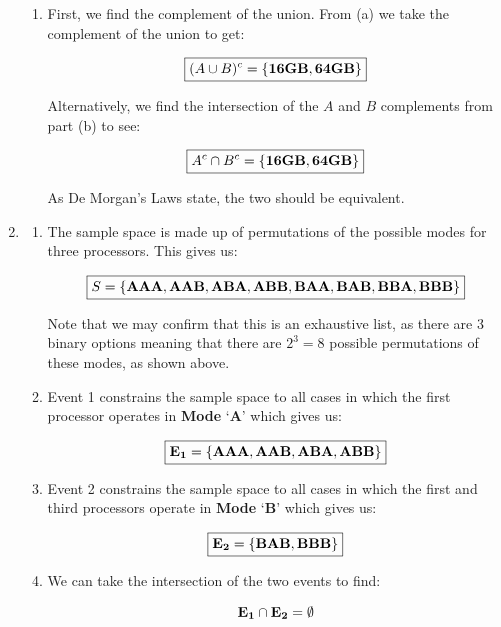 \begin{enumerate}
\begin{enumerate}
      \item First, we find the complement of the union. From (a) we take the complement of the union to get:

        $$\boxed{(A\cup B)^c=\left\{ \bold{16}\text{\textbf{GB}},\bold{64}\text{\textbf{GB}} \right\}}$$

        Alternatively, we find the intersection of the $A$ and $B$ complements from part (b) to see:

        $$\boxed{A^c\cap B^c=\left\{ \bold{16}\text{\textbf{GB}},\bold{64}\text{\textbf{GB}} \right\}}$$

        As De Morgan's Laws state, the two should be equivalent.

    \end{enumerate}

  \item 

    \begin{enumerate}

      \item The sample space is made up of permutations of the possible modes for three processors. This gives us:

        $$\boxed{S=\left\{ \text{\textbf{AAA}},\text{\textbf{AAB}},\text{\textbf{ABA}},\text{\textbf{ABB}},\text{\textbf{BAA}},\text{\textbf{BAB}},\text{\textbf{BBA}},\text{\textbf{BBB}} \right\}}$$

        Note that we may confirm that this is an exhaustive list, as there are 3 binary options meaning that there are $2^3=8$ possible permutations of these modes, as shown above.

      \item Event 1 constrains the sample space to all cases in which the first processor operates in \textbf{Mode} `\textbf{A}' which gives us:

        $$\boxed{\bold{E_1}=\left\{ \text{\textbf{AAA}},\text{\textbf{AAB}},\text{\textbf{ABA}},\text{\textbf{ABB}} \right\}}$$

      \item Event 2 constrains the sample space to all cases in which the first and third processors operate in \textbf{Mode} `\textbf{B}' which gives us:

        $$\boxed{\bold{E_2}=\left\{ \text{\textbf{BAB}},\text{\textbf{BBB}}\right\}}$$

      \item We can take the intersection of the two events to find:

        $$\bold{E_1}\cap\bold{E_2}=\emptyset$$


\end{enumerate}
\end{enumerate}
